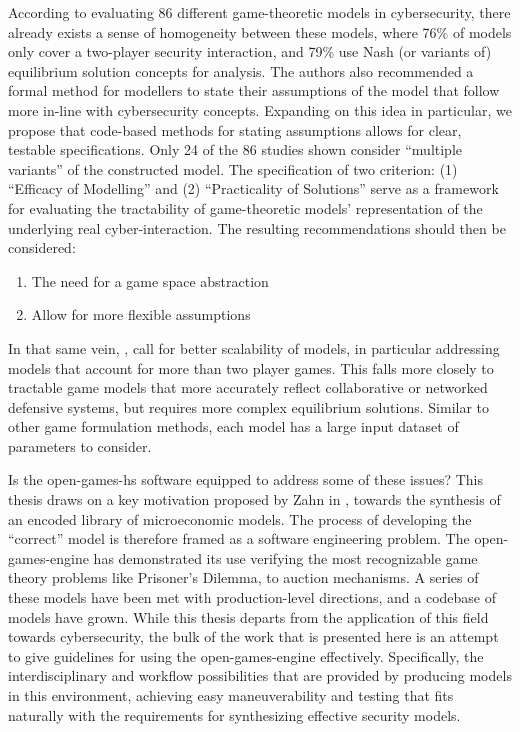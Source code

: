 \documentclass[11pt,titlepage,dvipsnames,table,xcdraw,english]{article}
\begin{document}
According to \cite{Collins2025} evaluating 86 different game-theoretic models in cybersecurity, there already exists a sense of homogeneity between these models, where 76\% of models only cover a two-player security interaction, and 79\% use Nash (or variants of) equilibrium solution concepts for analysis. The authors also recommended a formal method for modellers to state their assumptions of the model that follow more in-line with cybersecurity concepts. Expanding on this idea in particular, we propose that code-based methods for stating assumptions allows for clear, testable specifications. Only 24 of the 86 studies shown consider ``multiple variants'' of the constructed model. The specification of two criterion: (1) ``Efficacy of Modelling'' and (2) ``Practicality of Solutions'' serve as a framework for evaluating the tractability of game-theoretic models' representation of the underlying real cyber-interaction. The resulting recommendations should then be considered: \label{topic:collinsrec}
\begin{enumerate}
	\item The need for a game space abstraction 
	\item Allow for more flexible assumptions
\end{enumerate}

In that same vein, \cite{Egan2025}, \cite{Liang2013} call for better scalability of models, in particular addressing models that account for more than two player games. This falls more closely to tractable game models that more accurately reflect collaborative or networked defensive systems, but requires more complex equilibrium solutions. Similar to other game formulation methods, each model has a large input dataset of parameters to consider. 

Is the open-games-hs software equipped to address some of these issues? This thesis draws on a key motivation proposed by Zahn in \cite{ZahnCybercat}, towards the synthesis of an encoded library of microeconomic models. The process of developing the ``correct'' model is therefore framed as a software engineering problem. The open-games-engine has demonstrated its use verifying the most recognizable game theory problems like Prisoner's Dilemma, to auction mechanisms. A series of these models have been met with production-level directions, and a codebase of models have grown. While this thesis departs from the application of this field towards cybersecurity, the bulk of the work that is presented here is an attempt to give guidelines for using the open-games-engine effectively. Specifically, the interdisciplinary and workflow possibilities that are provided by producing models in this environment, achieving easy maneuverability and testing that fits naturally with the requirements for synthesizing effective security models. 
\end{document}
